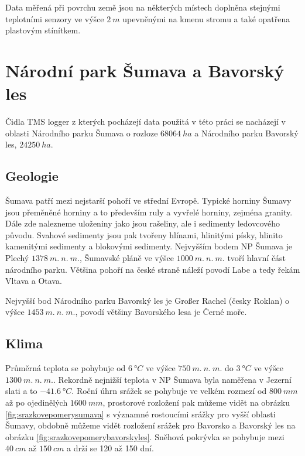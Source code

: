 Data měřená při povrchu země jsou na některých místech doplněna stejnými teplotními senzory ve výšce $\SI{2}{m}$ upevněnými na kmenu stromu a také opatřena plastovým stínítkem.

\section{Národní park Šumava a Bavorský les} \label{chap:sumavabavorskyles}
Čidla TMS logger z kterých pocházejí data použitá v této práci se nacházejí v oblasti Národního parku Šumava o rozloze $\SI{68 064}{ha}$\cite{npsumava} a Národního parku Bavorský les, $\SI{24 250}{ha}$.

\subsection{Geologie}
Šumava patří mezi nejstarší pohoří ve střední Evropě\cite{WildJan2004Cops}. Typické horniny Šumavy jsou přeměněné horniny a to především ruly a vyvřelé horniny, zejména granity. Dále zde nalezneme uloženiny jako jsou rašeliny, ale i sedimenty ledovcového původu. Svahové sedimenty jsou pak tvořeny hlínami, hlinitými písky, hlinito kamenitými sedimenty a blokovými sedimenty. Nejvyšším bodem NP Šumava je Plechý $\SI{1378}{m.\ n.\ m.}$, Šumavské pláně ve výšce $\SI{1000}{m.\ n.\ m.}$ tvoří hlavní část národního parku\cite{npsumava}. Většina pohoří na české straně náleží povodí Labe a tedy řekám Vltava a Otava.

Nejvyšší bod Národního parku Bavorský les je Großer Rachel (česky Roklan) o výšce $\SI{1453}{m.\ n.\ m.}$, povodí většiny Bavorského lesa je Černé moře.

\subsection{Klima}
Průměrná teplota se pohybuje od $\SI{6}{\degree C}$ ve výšce $\SI{750}{m.\ n.\ m.}$ do $\SI{3}{\degree C}$ ve výšce $\SI{1300}{m.\ n.\ m.}$. Rekordně nejnižší teplota v NP Šumava byla naměřena v Jezerní slati a to $\SI{-41.6}{\degree C}$. Roční úhrn srážek se pohybuje ve velkém rozmezí od $\SI{800}{mm}$ až po ojedinělých $\SI{1600}{mm}$, prostorové rozložení pak můžeme vidět na obrázku \ref{fig:srazkovepomerysumava} s významné rostoucími srážky pro vyšší oblasti Šumavy, obdobně můžeme vidět rozložení srážek pro Bavorsko a Bavorský les na obrázku \ref{fig:srazkovepomerybavorskyles}. Sněhová pokrývka se pohybuje mezi $\SI{40}{cm}$ až $\SI{150}{cm}$ a drží se 120 až 150 dní\cite{npsumava}.

